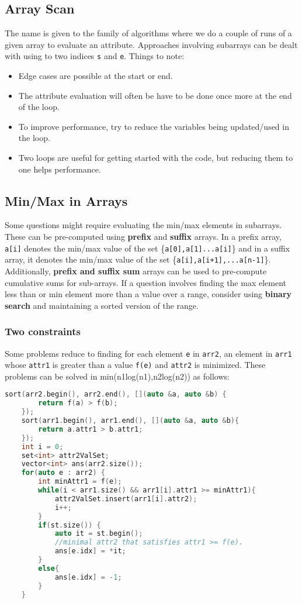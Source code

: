 \documentclass{article}
\begin{document}
\subsection{Array Scan}
The name is given to the family of algorithms where we do a couple of runs of a given array to evaluate an attribute. Approaches involving subarrays can be dealt with using to two indices \texttt{s} and \texttt{e}. Things to note:
\begin{itemize}
    \item Edge cases are possible at the start or end.
    \item The attribute evaluation will often be have to be done once more at the end of the loop.
    \item To improve performance, try to reduce the variables being updated/used in the loop.
    \item Two loops are useful for getting started with the code, but reducing them to one helps performance.
\end{itemize}
\subsection{Min/Max in Arrays}
Some questions might require evaluating the min/max elements in subarrays. These can be pre-computed using
\textbf{prefix} and \textbf{suffix} arrays. In a prefix array, \texttt{a[i]} denotes the min/max value
of the set \{\texttt{a[0],a[1]...a[i]}\} and in a suffix array, it denotes the min/max value
of the set \{\texttt{a[i],a[i+1],...a[n-1]}\}. Additionally, \textbf{prefix and suffix sum} arrays
can be used to pre-compute cumulative sums for sub-arrays. If a question involves finding
the max element less than or min element more than a value over a range, consider using 
\textbf{binary search} and maintaining a sorted version of the range.
\subsubsection{Two constraints}
Some problems reduce to finding for each element \texttt{e} in \texttt{arr2}, an 
element in \texttt{arr1} whose \texttt{attr1} is greater than a value \texttt{f(e)} 
and \texttt{attr2} is minimized. These problems can be solved in min(n1log(n1),n2log(n2)) as follows:
\begin{lstlisting}[caption=Two constraints, language=C++]
    sort(arr2.begin(), arr2.end(), [](auto &a, auto &b) {
        return f(a) > f(b);
    });
    sort(arr1.begin(), arr1.end(), [](auto &a, auto &b){
        return a.attr1 > b.attr1;
    });
    int i = 0;
    set<int> attr2ValSet;
    vector<int> ans(arr2.size());
    for(auto e : arr2) {
        int minAttr1 = f(e);
        while(i < arr1.size() && arr1[i].attr1 >= minAttr1){
            attr2ValSet.insert(arr1[i].attr2);
            i++;
        }
        if(st.size()) {
            auto it = st.begin();
            //minimal attr2 that satisfies attr1 >= f(e).
            ans[e.idx] = *it;
        }
        else{
            ans[e.idx] = -1;
        }
    }
\end{lstlisting}
\end{document}
